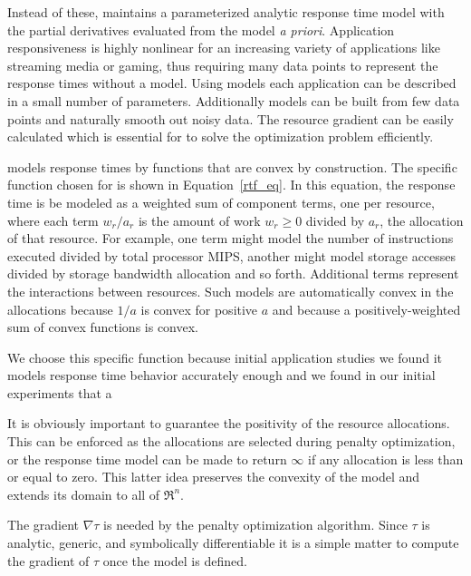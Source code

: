 Instead of these, \pacora maintains a parameterized analytic response time model with the partial derivatives evaluated from the model \emph{a priori}. Application responsiveness is highly nonlinear for an increasing variety of applications like streaming media or gaming, thus requiring many data points to represent the response times without a model. Using models each application can be described in a small number of parameters.  Additionally models can be built from few data points and naturally smooth out noisy data. The resource gradient can be easily calculated which is essential for \pacora to solve the optimization problem efficiently.  

\pacora models response times by functions that are convex by construction.  The specific function chosen for \pacora is shown in Equation~\ref{rtf_eq}.  In this equation, the response time is be modeled as a weighted sum of component terms, one per resource, where each term $w_r/a_r$ is the amount of work $w_r \geq 0$ divided by $a_r$, the allocation of that resource\cite{Snav}. For example, one term might model the number of instructions executed divided by total processor MIPS, another might model storage accesses divided by storage bandwidth allocation and so forth. Additional terms represent the interactions between resources.
Such models are automatically convex in the allocations because $1/a$ is convex for positive $a$ and because a positively-weighted sum of convex functions is convex.  

We choose this specific function because initial application studies we found it models response time behavior accurately enough 
and we found in our initial experiments that a 


It is obviously important to guarantee the positivity of the resource allocations.
This can be enforced as the allocations are selected during penalty optimization,
or the response time model can be made to return $\infty$ if any allocation is less than or equal to zero.
This latter idea preserves the convexity of the model and extends its domain to all of $\Re^n$.



The gradient $\nabla\tau$ is needed by the penalty optimization algorithm.
Since $\tau$ is analytic, generic, and symbolically differentiable
it is a simple matter to compute the gradient of $\tau$ once the model is defined.

